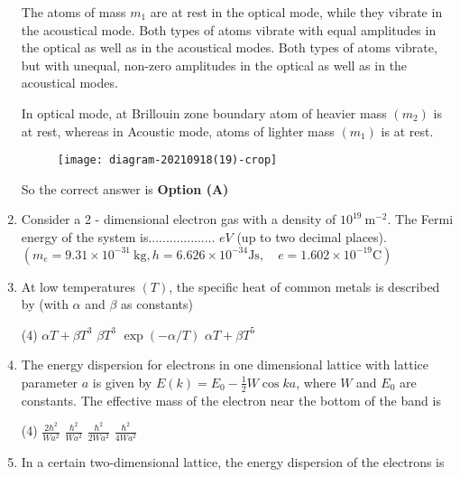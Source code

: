 \begin{enumerate}
\begin{tasks}
\task[\textbf{B.}]  The atoms of mass $m_{1}$ are at rest in the optical mode, while they vibrate in the acoustical mode.
\task[\textbf{C.}] Both types of atoms vibrate with equal amplitudes in the optical as well as in the acoustical modes.
\task[\textbf{D.}] Both types of atoms vibrate, but with unequal, non-zero amplitudes in the optical as well as in the acoustical modes.
\end{tasks}
\begin{answer}
In optical mode, at Brillouin zone boundary atom of heavier mass $\left(m_{2}\right)$ is at rest, whereas in Acoustic mode, atoms of lighter mass $\left(m_{1}\right)$ is at rest.\\
\begin{figure}[H]
	\centering
	\texttt{[image: diagram-20210918(19)-crop]}
\end{figure}
So the correct answer is \textbf{Option (A)}
\end{answer}
	\item Consider a 2 - dimensional electron gas with a density of $10^{19} \mathrm{~m}^{-2}$. The Fermi energy of the system is................... $e V$ (up to two decimal places).\\
	$\left(m_{e}=9.31 \times 10^{-31} \mathrm{~kg}, h=6.626 \times 10^{-34} \mathrm{Js}, \quad e=1.602 \times 10^{-19} \mathrm{C}\right)$
{	}
	\item At low temperatures $(T)$, the specific heat of common metals is described by (with $\alpha$ and $\beta$ as constants)
{	}
\begin{tasks}(4)
\task[\textbf{A.}] $\alpha T+\beta T^{3}$
\task[\textbf{B.}] $\beta T^{3}$
\task[\textbf{C.}] $\exp (-\alpha / T)$
\task[\textbf{D.}] $\alpha T+\beta T^{5}$
\end{tasks}
	\item The energy dispersion for electrons in one dimensional lattice with lattice parameter $a$ is given by $E(k)=E_{0}-\frac{1}{2} W \cos k a$, where $W$ and $E_{0}$ are constants. The effective mass of the electron near the bottom of the band is
{	}
\begin{tasks}(4)
\task[\textbf{A.}] $\frac{2 \hbar^{2}}{W a^{2}}$
\task[\textbf{B.}] $\frac{\hbar^{2}}{W a^{2}}$
\task[\textbf{C.}] $\frac{\hbar^{2}}{2 W a^{2}}$
\task[\textbf{D.}] $\frac{\hbar^{2}}{4 W a^{2}}$
\end{tasks}
	\item In a certain two-dimensional lattice, the energy dispersion of the electrons is

\end{enumerate}
